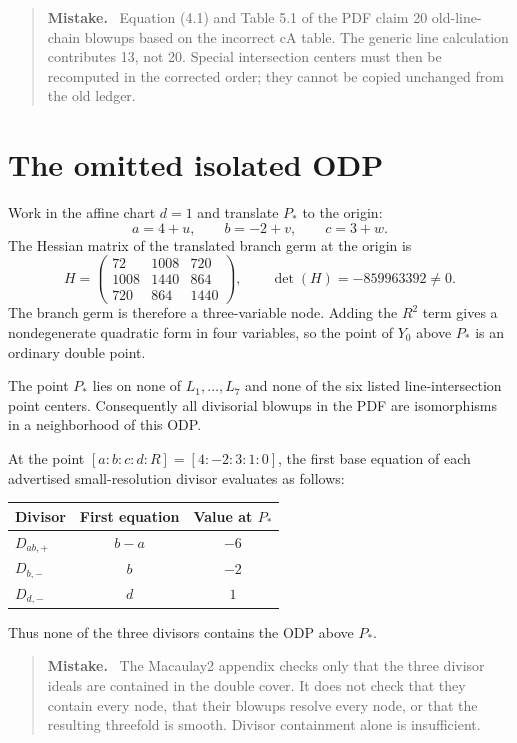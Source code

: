 \documentclass[11pt]{article}
\newenvironment{mistake}
  {\begin{quote}\color{mistakered}\textbf{Mistake.}\ }
  {\end{quote}}
\begin{document}
\begin{mistake}
Equation (4.1) and Table 5.1 of the PDF claim 20 old-line-chain blowups based on the
incorrect cA table.  The generic line calculation contributes 13, not 20.  Special
intersection centers must then be recomputed in the corrected order; they cannot be copied
unchanged from the old ledger.
\end{mistake}

\section{The omitted isolated ODP}

Work in the affine chart $d=1$ and translate $P_*$ to the origin:
\[
  a=4+u,\qquad b=-2+v,\qquad c=3+w.
\]
The Hessian matrix of the translated branch germ at the origin is
\[
H=
\begin{pmatrix}
72&1008&720\\
1008&1440&864\\
720&864&1440
\end{pmatrix},
\qquad
\det(H)=-859963392\ne0.
\]
The branch germ is therefore a three-variable node.  Adding the $R^2$ term gives a
nondegenerate quadratic form in four variables, so the point of $Y_0$ above $P_*$ is an
ordinary double point.

The point $P_*$ lies on none of $L_1,\ldots,L_7$ and none of the six listed line-intersection
point centers.  Consequently all divisorial blowups in the PDF are isomorphisms in a
neighborhood of this ODP.

At the point $[a:b:c:d:R]=[4:-2:3:1:0]$, the first base equation of each advertised
small-resolution divisor evaluates as follows:
\begin{center}
\begin{tabular}{@{}lcc@{}}
\toprule
Divisor & First equation & Value at $P_*$ \\
\midrule
$D_{ab,+}$ & $b-a$ & $-6$ \\
$D_{b,-}$ & $b$ & $-2$ \\
$D_{d,-}$ & $d$ & $1$ \\
\bottomrule
\end{tabular}
\end{center}
Thus none of the three divisors contains the ODP above $P_*$.

\begin{mistake}
The Macaulay2 appendix checks only that the three divisor ideals are contained in the double
cover.  It does not check that they contain every node, that their blowups resolve every
node, or that the resulting threefold is smooth.  Divisor containment alone is insufficient.
\end{mistake}
\end{document}

